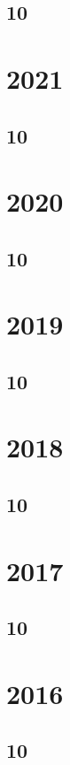 \documentclass[11pt]{book}
\begin{document}
\subsection{10}

\section{2021}
\subsection{10}

\section{2020}
\subsection{10}

\section{2019} 
\subsection{10}

\section{2018} 
\subsection{10}


\section{2017}
\subsection{10}






\section{2016}
\subsection{10}

\end{document}
